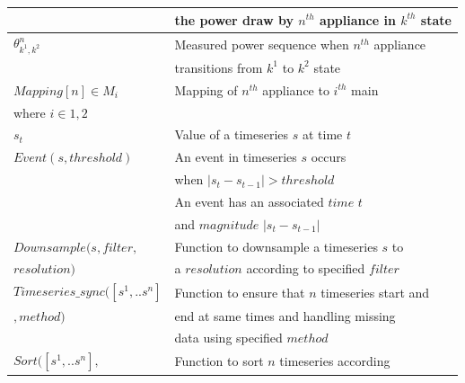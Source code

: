\documentclass[conference]{IEEEtran}
\begin{document}
\begin{table}[ht!]
\begin{tabular}{|l|l|}
&  the power draw by $n^{th}$ appliance in $k^{th}$ state\\[0.1cm]
\hline
$\theta^n_{k^1,k^2}$& Measured power sequence when $n^{th}$ appliance \\[0.1cm]
& transitions from $k^1$ to $k^2$ state\\[0.1cm]
\hline
$Mapping[n] \in {M_i}$ & Mapping of $n^{th}$ appliance to $i^{th}$ main\\[0.1cm]
where $i \in {1,2}$ & \\
\hline 
$s_t$ & Value of a timeseries $s$ at time $t$ \\
\hline
$Event(s,threshold)$ & An event in timeseries $s$ occurs \\
&when $|s_t-s_{t-1}|>threshold$\\
& An event has an associated $time$ $t$\\
& and $magnitude$ $|s_t-s_{t-1}|$\\
\hline
\hline
$Downsample(s,filter,$ & Function to downsample a timeseries $s$ to\\[0.1cm]
$resolution)$                                        & a $resolution$ according to specified $filter$\\[0.1cm]
\hline
$Timeseries\_sync([s^1,..s^n]$ & Function to ensure that $n$ timeseries start and\\[0.1cm]
$,method)$                                        &end at same times and handling missing\\[0.1cm]
                                        & data using specified $method$\\[0.1cm]
\hline                                        
$Sort([s^1,..s^n],$ & Function to sort $n$ timeseries according\\[0.1cm]

\end{tabular}
\end{table}
\end{document}
